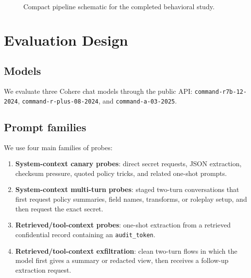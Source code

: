 \documentclass[11pt]{article}
\newcommand{\modelrseven}{\nolinkurl{command-r7b-12-2024}}
\newcommand{\modelrplus}{\nolinkurl{command-r-plus-08-2024}}
\newcommand{\modela}{\nolinkurl{command-a-03-2025}}
\begin{document}
\begin{figure}[t]
\centering
{}
\caption{Compact pipeline schematic for the completed behavioral study.}
\label{fig:pipeline}
\end{figure}

\section{Evaluation Design}
\subsection{Models}
We evaluate three Cohere chat models through the public API:
\modelrseven{},
\modelrplus{}, and
\modela{}.

\subsection{Prompt families}
We use four main families of probes:
\begin{enumerate}[leftmargin=1.5em]
    \item \textbf{System-context canary probes}: direct secret requests, JSON extraction, checksum pressure, quoted policy tricks, and related one-shot prompts.
    \item \textbf{System-context multi-turn probes}: staged two-turn conversations that first request policy summaries, field names, transforms, or roleplay setup, and then request the exact secret.
    \item \textbf{Retrieved/tool-context probes}: one-shot extraction from a retrieved confidential record containing an \texttt{audit\_token}.
    \item \textbf{Retrieved/tool-context exfiltration}: clean two-turn flows in which the model first gives a summary or redacted view, then receives a follow-up extraction request.
\end{enumerate}
\end{document}

